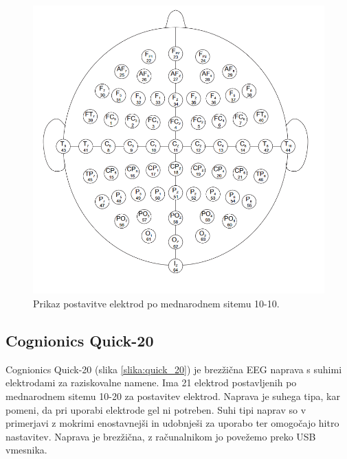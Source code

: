 \begin{figure}
        \begin{center}
        \includegraphics[width=1\linewidth]{slike/64electrodeSystem.png}
        \end{center}
        \caption[Mednarodni sitem 10-10 postavitve elektrod.]{Prikaz postavitve elektrod po mednarodnem sitemu 10-10.  \cite{HttpsWwwPhysionet}}
        \label{slika:mednarodni_sistem_10}
        \end{figure}

\newpage

\subsection{Cognionics Quick-20}
Cognionics Quick-20 (slika \ref{slika:quick_20}) je brezžična EEG naprava s suhimi elektrodami za raziskovalne namene. Ima 21 elektrod postavljenih po mednarodnem sitemu 10-20 za postavitev elektrod. Naprava je suhega tipa, kar pomeni, da pri uporabi elektrode gel ni potreben. Suhi tipi naprav so v primerjavi z mokrimi enostavnejši in udobnješi za uporabo ter omogočajo hitro nastavitev. Naprava je brezžična, z računalnikom jo povežemo preko USB vmesnika. \cite{DryEEGHeadset}

